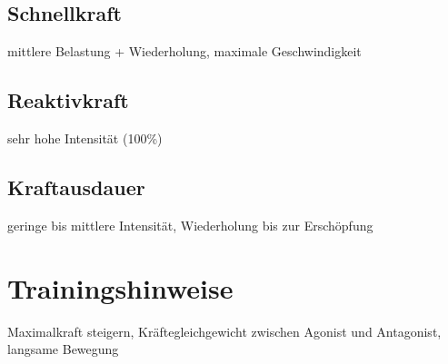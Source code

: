 \documentclass{article}
\begin{document}
\subsection*{Schnellkraft}
mittlere Belastung + Wiederholung, maximale Geschwindigkeit
\subsection*{Reaktivkraft}
sehr hohe Intensität (100\%)
\subsection*{Kraftausdauer}
geringe bis mittlere Intensität, Wiederholung bis zur Erschöpfung
\section*{Trainingshinweise}
Maximalkraft steigern, Kräftegleichgewicht zwischen Agonist und Antagonist, langsame Bewegung
\end{document}
